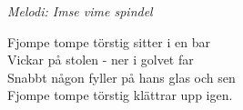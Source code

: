 {\footnotesize\textit{Melodi: Imse vime spindel}}\par
\vspace{10pt}
Fjompe tompe törstig sitter i en bar\\
Vickar på stolen - ner i golvet far\\
Snabbt någon fyller på hans glas och sen\\
Fjompe tompe törstig klättrar upp igen.
